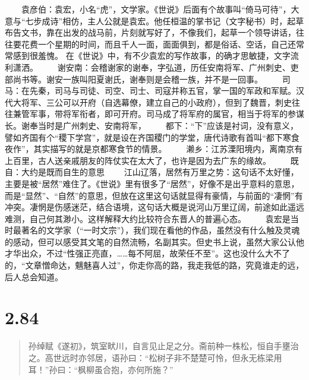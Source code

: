 \documentclass[]{book}
\begin{document}
　　袁彦伯：袁宏，小名``虎''，文学家。《世说》后面有个故事叫``倚马可待''，大意与``七步成诗''相仿，主人公就是袁宏。他任桓温的掌书记（文字秘书）时，起草布告文书，靠在出发的战马前，片刻就写好了，不像我们，起草一个领导讲话，往往要花费一个星期的时间，而且千人一面，面面俱到，都是俗话、空话，自己还常常感到很羞愧。
在《世说》中，有不少袁宏的写作故事，的确才思敏捷，文字流利潇洒。
　　谢安南：会稽谢家的谢奉，字弘道，历任安南将军、广州刺史、吏部尚书等。谢安一族叫阳夏谢氏，谢奉则是会稽一族，并不是一回事。
　　司马：在先秦，司马与司徒、司空、司士、司寇并称五官，掌一国的军政和军赋。汉代大将军、三公可以开府（自选幕僚，建立自己的小政府），但到了魏晋，刺史往往兼管军事，带将军衔者，即可开府。司马成了将军府的属官，相当于将军的参谋长。谢奉当时是广州刺史、安南将军，
　　都下：``下''应该是衬词，没有意义，譬如齐国有个``稷下学宫''，就是设在齐国稷门的学堂，唐代诗歌有首叫``都下寒食夜作''，其实描写的就是京都寒食节的情景。
　　濑乡：江苏溧阳境内，离南京有上百里，古人送亲戚朋友的阵仗实在太大了，也许是因为去广东的缘故。
　　既自：大约是既而自生的意思
　　江山辽落，居然有万里之势：这句话不太好懂，主要是被``居然''难住了。《世说》里有很多了``居然''，好像不是出乎意料的意思，而是``显然''、``自然''的意思，但放在这里这句话就显得有豪情，与前面的``凄惘''有冲突。凄惘是伤感迷茫，结合语境，这句话大概是说河山万里辽阔，前途如此遥远难测，自己何其渺小。这样解释大约比较符合东晋人的普遍心态。
　　袁宏是当时最著名的文学家（``一时文宗''），我们现在看他的作品，虽然没有什么触及灵魂的感动，但可以感受其文笔的自然流畅，名副其实。但史书上说，虽然大家公认他才华出众，不过``性强正亮直，\ldots{}\ldots{}每不阿屈，故荣任不至''。这也没什么大不了的，``文章憎命达，魑魅喜人过''，你走你高的路，我走我低的路，究竟谁走的远，后人总会知道。

\section{2.84}\label{section-130}

\begin{quote}
孙绰赋《遂初》，筑室畎川，自言见止足之分。斋前种一株松，恒自手壅治之。高世远时亦邻居，语孙曰：``松树子非不楚楚可怜，但永无栋梁用耳！''孙曰：``枫柳虽合抱，亦何所施？''
\end{quote}
\end{document}
